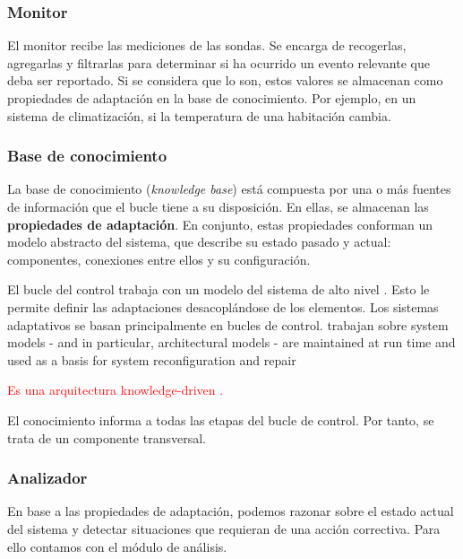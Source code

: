 \subsubsection{Monitor}
El monitor recibe las mediciones de las sondas. Se encarga de recogerlas, agregarlas y filtrarlas para determinar si ha ocurrido un evento relevante que deba ser reportado. Si se considera que lo son, estos valores se almacenan como propiedades de adaptación en la base de conocimiento. \cite{fonsEspecificacionSistemasAutoadaptativos2021} Por ejemplo, en un sistema de climatización, si la temperatura de una habitación cambia.


\subsubsection{Base de conocimiento}

La base de conocimiento (\emph{knowledge base}) está compuesta por una o más fuentes de información que el bucle tiene a su disposición. En ellas, se almacenan las \textbf{propiedades de adaptación}. En conjunto, estas propiedades conforman un modelo abstracto del sistema, que describe su estado pasado y actual: componentes, conexiones entre ellos y su configuración. \cite{garlanIncreasingSystemDependability2003}

El bucle del control trabaja con un modelo del sistema de alto nivel \cite{garlanIncreasingSystemDependability2003}. Esto le permite definir las adaptaciones desacoplándose de los elementos. Los sistemas adaptativos se basan principalmente en bucles de control. trabajan sobre system models - and in particular, architectural models - are maintained at run time
and used as a basis for system reconfiguration and repair \cite{garlanIncreasingSystemDependability2003}

\textcolor{red}{Es una arquitectura knowledge-driven \cite{taylorSoftwareArchitectureFoundations2009}.}

El conocimiento informa a todas las etapas del bucle de control. Por tanto, se trata de un componente transversal.

\subsubsection{Analizador}

En base a las propiedades de adaptación, podemos razonar sobre el estado actual del sistema y detectar situaciones que requieran de una acción correctiva. Para ello contamos con el módulo de análisis.

